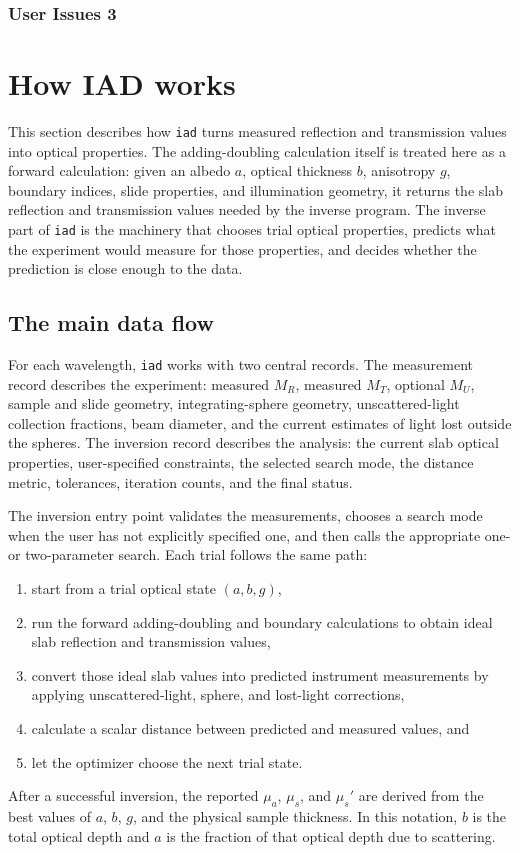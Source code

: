 \documentclass{article}
\newcommand\iadprog{\texttt{iad}}
\begin{document}
\subsubsection*{User Issues 3}

\clearpage
\section{How IAD works}

This section describes how \iadprog{} turns measured reflection and transmission
values into optical properties.  The adding-doubling calculation itself is
treated here as a forward calculation: given an albedo $a$, optical thickness
$b$, anisotropy $g$, boundary indices, slide properties, and illumination
geometry, it returns the slab reflection and transmission values needed by the
inverse program.  The inverse part of \iadprog{} is the machinery that chooses
trial optical properties, predicts what the experiment would measure for those
properties, and decides whether the prediction is close enough to the data.

\subsection{The main data flow}

For each wavelength, \iadprog{} works with two central records.  The measurement
record describes the experiment: measured $M_R$, measured $M_T$, optional
$M_U$, sample and slide geometry, integrating-sphere geometry, unscattered-light
collection fractions, beam diameter, and the current estimates of light lost
outside the spheres.  The inversion record describes the analysis: the current
slab optical properties, user-specified constraints, the selected search mode,
the distance metric, tolerances, iteration counts, and the final status.

The inversion entry point validates the measurements, chooses a search mode
when the user has not explicitly specified one, and then calls the appropriate
one- or two-parameter search.  Each trial follows the same path:
\begin{enumerate}
\item start from a trial optical state $(a,b,g)$,
\item run the forward adding-doubling and boundary calculations to obtain
      ideal slab reflection and transmission values,
\item convert those ideal slab values into predicted instrument measurements
      by applying unscattered-light, sphere, and lost-light corrections,
\item calculate a scalar distance between predicted and measured values, and
\item let the optimizer choose the next trial state.
\end{enumerate}
After a successful inversion, the reported $\mu_a$, $\mu_s$, and $\mu_s'$ are
derived from the best values of $a$, $b$, $g$, and the physical sample
thickness.  In this notation, $b$ is the total optical depth and $a$ is the
fraction of that optical depth due to scattering.
\end{document}
